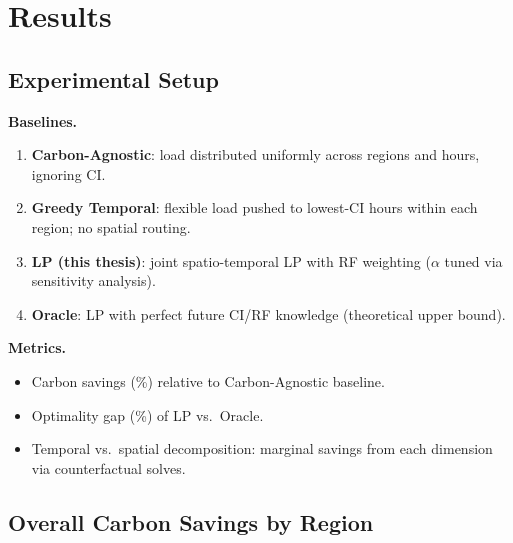 \section{Results}
\label{sec:results}


\subsection{Experimental Setup}

\textbf{Baselines.}
\begin{enumerate}[leftmargin=1.5em]
  \item \textbf{Carbon-Agnostic}: load distributed uniformly across regions and hours, ignoring CI.
  \item \textbf{Greedy Temporal}: flexible load pushed to lowest-CI hours within each region; no spatial routing.
  \item \textbf{LP (this thesis)}: joint spatio-temporal LP with RF weighting ($\alpha$ tuned via sensitivity analysis).
  \item \textbf{Oracle}: LP with perfect future CI/RF knowledge (theoretical upper bound).
\end{enumerate}

\textbf{Metrics.}
\begin{itemize}[leftmargin=1.5em]
  \item Carbon savings (\%) relative to Carbon-Agnostic baseline.
  \item Optimality gap (\%) of LP vs.\ Oracle.
  \item Temporal vs.\ spatial decomposition: marginal savings from each dimension via counterfactual solves.
\end{itemize}

\subsection{Overall Carbon Savings by Region}


